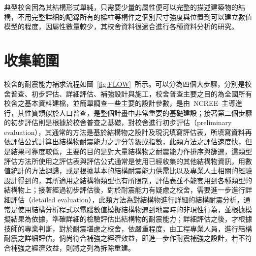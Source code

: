 典型校舍因為其結構形式單純，只需要少量的屬性便可以完整的描述建築物的結構，不用完整詳細的記錄所有的樑柱等構件之個別尺寸強度與位置到可以建立數值模型的程度，因屬性數量較少，其校舍資料很適合進行各種資料分析的研究。

\section{收集範圍}

校舍的耐震能力補求流程如圖~\ref{fig:FLOW}~所示。可以分為四個大步驟，分別是校舍普查、初步評估、詳細評估、補強設計與施工，校舍普查主要之目的為全國所有校舍之基本資料建檔，並簡單調查一些主要的設計參數，是由~NCREE~主導進行，其性質類似於人口普查，是整個計畫中非常重要的基礎建設；接著第二個步驟的初步評估則是根據於校舍普查之基礎，對校舍進行初步評估（preliminary evaluation），其通常的方法是基於結構物之設計及現況填寫評估表，所填寫資料再依評估公式計算出結構物耐震能力之評分等級或指數，此類方法之評估速度快，但是結果可靠度較低，主要的目的是對大量結構物之耐震能力作排序與篩選，這類型評估方法所使用之評估表與評估公式通常是使用已經收集的其他結構物資訊，用數值統計的方法迴歸，或是根據基本的結構耐震能力供需比以及專業人士相關的經驗設計得到的，其所適用之結構物類型也有所限制，評估表並不能套用到各種類型的結構物上；接著經過初步評估後，對於耐震能力有疑慮之校舍，需要進一步進行詳細評估（detailed evaluation），此類方法為對結構物進行詳細的結構耐震分析，通常是使用結構分析程式以電腦數值模擬結構物遇到地震時的非現性行為，並根據模擬結果為依據，準確詳細的檢驗評估出結構物的耐震能力；詳細評估之後，才根據技師的專業判斷，對於耐震堪慮之校舍，依嚴重程度，由工程專業人員，進行結構耐震之詳細評估，倘尚符合補強之經濟效益，即進一步作耐震補強之設計，若不符合補強之經濟效益，則將之列為拆除重建。


